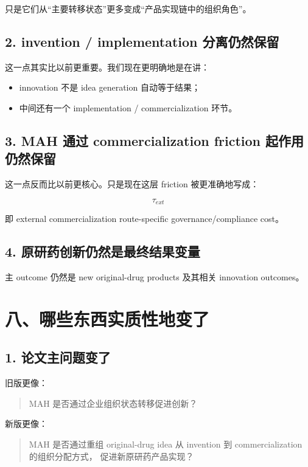 \documentclass[12pt]{ctexart}
\begin{document}
只是它们从“主要转移状态”更多变成“产品实现链中的组织角色”。

\subsection*{2. invention / implementation 分离仍然保留}

这一点其实比以前更重要。我们现在更明确地是在讲：

\begin{itemize}[leftmargin=2em]
    \item innovation 不是 idea generation 自动等于结果；
    \item 中间还有一个 implementation / commercialization 环节。
\end{itemize}

\subsection*{3. MAH 通过 commercialization friction 起作用仍然保留}

这一点反而比以前更核心。只是现在这层 friction 被更准确地写成：

\[
\tau_{ext}
\]

即 external commercialization route-specific governance/compliance cost。

\subsection*{4. 原研药创新仍然是最终结果变量}

主 outcome 仍然是 new original-drug products 及其相关 innovation outcomes。

\section{八、哪些东西实质性地变了}

\subsection*{1. 论文主问题变了}

旧版更像：

\begin{quote}
MAH 是否通过企业组织状态转移促进创新？
\end{quote}

新版更像：

\begin{quote}
MAH 是否通过重组 original-drug idea 从 invention 到 commercialization 的组织分配方式，
促进新原研药产品实现？
\end{quote}
\end{document}
